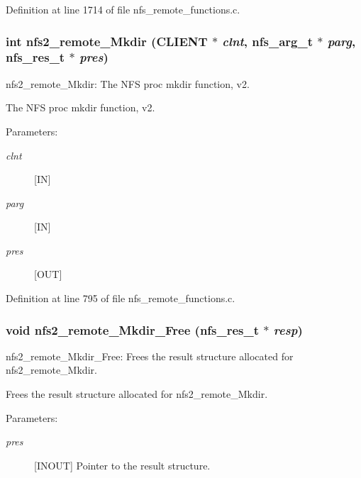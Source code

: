 Definition at line 1714 of file nfs\_\-remote\_\-functions.c.
\subsubsection[{nfs2\_\-remote\_\-Mkdir}]{\setlength{\rightskip}{0pt plus 5cm}int nfs2\_\-remote\_\-Mkdir (CLIENT $\ast$ {\em clnt}, \/  nfs\_\-arg\_\-t $\ast$ {\em parg}, \/  nfs\_\-res\_\-t $\ast$ {\em pres})}\label{group__NFSprocs_g33df52a14e9fb3fada03f43c5ad25ae7}


nfs2\_\-remote\_\-Mkdir: The NFS proc mkdir function, v2.

The NFS proc mkdir function, v2.

\begin{Desc}
\item[Parameters:]
\begin{description}
\item[{\em clnt}][IN] \item[{\em parg}][IN] \item[{\em pres}][OUT] \end{description}
\end{Desc}


Definition at line 795 of file nfs\_\-remote\_\-functions.c.
\subsubsection[{nfs2\_\-remote\_\-Mkdir\_\-Free}]{\setlength{\rightskip}{0pt plus 5cm}void nfs2\_\-remote\_\-Mkdir\_\-Free (nfs\_\-res\_\-t $\ast$ {\em resp})}\label{group__NFSprocs_gbadbd2dfbbbcfefe0ee1dbae5e094f4e}


nfs2\_\-remote\_\-Mkdir\_\-Free: Frees the result structure allocated for nfs2\_\-remote\_\-Mkdir.

Frees the result structure allocated for nfs2\_\-remote\_\-Mkdir.

\begin{Desc}
\item[Parameters:]
\begin{description}
\item[{\em pres}][INOUT] Pointer to the result structure. \end{description}
\end{Desc}


